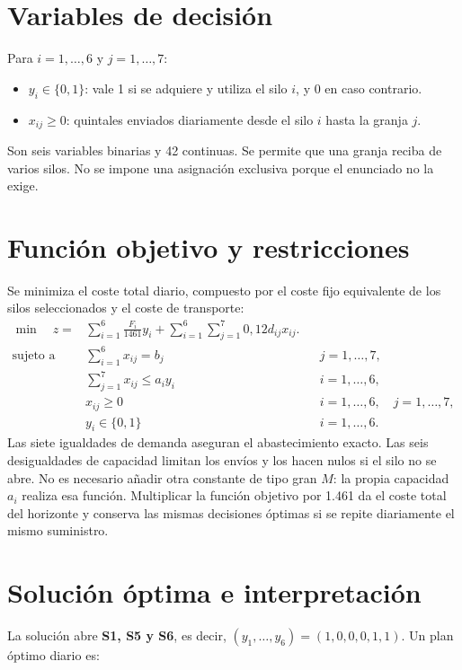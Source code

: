 \documentclass[11pt,a4paper]{article}
\begin{document}
\section*{Variables de decisión}
Para $i=1,\ldots,6$ y $j=1,\ldots,7$:
\begin{itemize}
\item $y_i\in\{0,1\}$: vale 1 si se adquiere y utiliza el silo $i$, y 0 en caso contrario.
\item $x_{ij}\geq0$: quintales enviados diariamente desde el silo $i$ hasta la granja $j$.
\end{itemize}
Son seis variables binarias y 42 continuas. Se permite que una granja reciba de varios
silos. No se impone una asignación exclusiva porque el enunciado no la exige.

\newpage
\section*{Función objetivo y restricciones}
Se minimiza el coste total diario, compuesto por el coste fijo equivalente de los silos
seleccionados y el coste de transporte:
\begin{align*}
\min\quad z={}&\sum_{i=1}^{6}\frac{F_i}{1461}y_i+
\sum_{i=1}^{6}\sum_{j=1}^{7}0{,}12d_{ij}x_{ij}.\\[4pt]
\text{sujeto a}\quad
&\sum_{i=1}^{6}x_{ij}=b_j &&j=1,\ldots,7,\\
&\sum_{j=1}^{7}x_{ij}\leq a_i y_i &&i=1,\ldots,6,\\
&x_{ij}\geq0 &&i=1,\ldots,6,\quad j=1,\ldots,7,\\
&y_i\in\{0,1\} &&i=1,\ldots,6.
\end{align*}
Las siete igualdades de demanda aseguran el abastecimiento exacto. Las seis desigualdades
de capacidad limitan los envíos y los hacen nulos si el silo no se abre. No es necesario
añadir otra constante de tipo gran $M$: la propia capacidad $a_i$ realiza esa función.
Multiplicar la función objetivo por 1.461 da el coste total del horizonte y conserva
las mismas decisiones óptimas si se repite diariamente el mismo suministro.

\section*{Solución óptima e interpretación}
La solución abre \textbf{S1, S5 y S6}, es decir,
$(y_1,\ldots,y_6)=(1,0,0,0,1,1)$. Un plan óptimo diario es:
\end{document}
